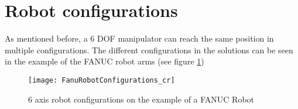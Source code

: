 \section{Robot configurations}

As mentioned before, a 6 \ac{DOF} manipulator can reach the same position in multiple configurations.
The different configurations in the solutions can be seen in the example of the FANUC robot arms (see figure \ref{fig:RobotConfigs})
\medskip

\begin{figure}[H]
	\texttt{[image: FanuRobotConfigurations\_cr]}
	\caption{6 axis robot configurations on the example of a FANUC Robot \cite{QingFanucAcademy}}
	\label{fig:RobotConfigs}
\end{figure}